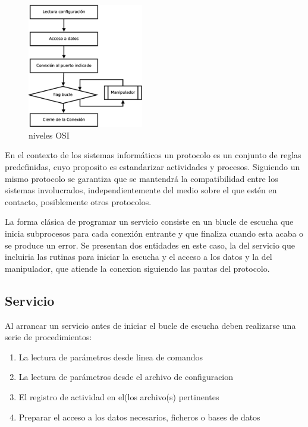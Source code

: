 \documentclass[a4paper,spanish,12pt]{book}
\begin{document}
\begin{figure}
	\includegraphics[width=0.45\textwidth]{img/FlujoServicio.eps}
              \caption{niveles OSI}
  \label{fig:nivelesOSI}
\end{figure}

En el contexto de los sistemas informáticos un protocolo es un conjunto de reglas predefinidas, cuyo proposito es estandarizar actividades y procesos. Siguiendo un mismo protocolo se garantiza que se mantendrá la compatibilidad entre los sistemas involucrados, independientemente del medio sobre el que est\'en en contacto, posiblemente otros protocolos.

La forma cl\'asica de programar un servicio consiste en un blucle de escucha que inicia subprocesos para cada conexi\'on entrante y que finaliza cuando esta acaba o se produce un error. Se presentan dos entidades en este caso, la del servicio que incluiria las rutinas para iniciar la escucha y el acceso a los datos y la del manipulador, que atiende la conexion siguiendo las pautas del protocolo.

\subsection{Servicio}

Al arrancar un servicio antes de iniciar el bucle de escucha deben realizarse una serie de procedimientos:
\begin{enumerate}
	\item La lectura de parámetros desde linea de comandos
	\item La lectura de parámetros desde el archivo de configuracion
	\item El registro de actividad en el(los archivo(s) pertinentes
	\item Preparar el acceso a los datos necesarios, ficheros o bases de datos
\end{enumerate}
\end{document}

